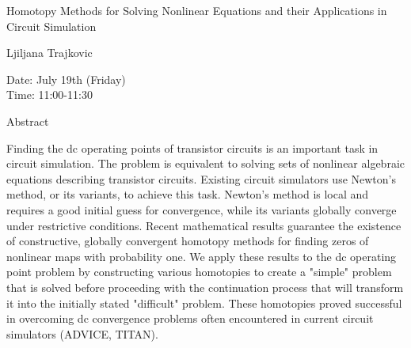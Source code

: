\begin{center}
\LARGE
Homotopy Methods for Solving Nonlinear Equations and
            their Applications in Circuit Simulation

\end{center}

\begin{center}
\Large
Ljiljana Trajkovic

\end{center}

\noindent
Date:  July 19th (Friday)\\
Time: 11:00-11:30\\

\begin{center}
\large
Abstract
\end{center}

Finding the dc operating points of transistor circuits is an important task in circuit simulation. The
problem is equivalent to solving sets of nonlinear algebraic equations describing transistor circuits.
Existing circuit simulators use Newton's method, or its variants, to achieve this task. Newton's
method is local and requires a good initial guess for convergence, while its variants globally
converge under restrictive conditions. Recent mathematical results guarantee the existence of
constructive, globally convergent homotopy methods for finding zeros of nonlinear maps with
probability one. We apply these results to the dc operating point problem by constructing various
homotopies to create a "simple" problem that is solved before proceeding with the continuation
process that will transform it into the initially stated "difficult" problem. These homotopies
proved successful in overcoming dc convergence problems often encountered in current circuit
simulators (ADVICE, TITAN). 

